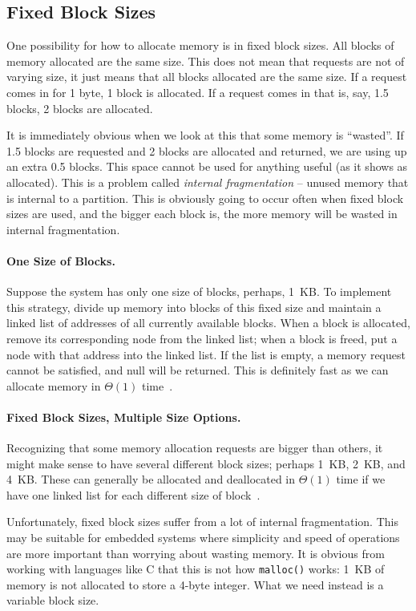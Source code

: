 \subsection*{Fixed Block Sizes}
One possibility for how to allocate memory is in fixed block sizes. All blocks of memory allocated are the same size. This does not mean that requests are not of varying size, it just means that all blocks allocated are the same size. If a request comes in for 1 byte, 1 block is allocated. If a request comes in that is, say, 1.5 blocks, 2 blocks are allocated. 

It is immediately obvious when we look at this that some memory is ``wasted''. If 1.5 blocks are requested and 2 blocks are allocated and returned, we are using up an extra 0.5 blocks. This space cannot be used for anything useful (as it shows as allocated). This is a problem called \textit{internal fragmentation} -- unused memory that is internal to a partition. This is obviously going to occur often when fixed block sizes are used, and the bigger each block is, the more memory will be wasted in internal fragmentation. 

\paragraph{One Size of Blocks.} Suppose the system has only one size of blocks, perhaps, 1~KB. To implement this strategy, divide up memory into blocks of this fixed size and maintain a linked list of addresses of all currently available blocks. When a block is allocated, remove its corresponding node from the linked list; when a block is freed, put a node with that address into the linked list. If the list is empty, a memory request cannot be satisfied, and null will be returned. This is definitely fast as we can allocate memory in $\Theta(1)$ time~\cite{mte241}.

\paragraph{Fixed Block Sizes, Multiple Size Options.} Recognizing that some memory allocation requests are bigger than others, it might make sense to have several different block sizes; perhaps 1~KB, 2~KB, and 4~KB. These can generally be allocated and deallocated in $\Theta(1)$ time if we have one linked list for each different size of block~\cite{mte241}.

Unfortunately, fixed block sizes suffer from a lot of internal fragmentation. This may be suitable for embedded systems where simplicity and speed of operations are more important than worrying about wasting memory. It is obvious from working with languages like C that this is not how \texttt{malloc()} works: 1~KB of memory is not allocated to store a 4-byte integer. What we need instead is a variable block size.

